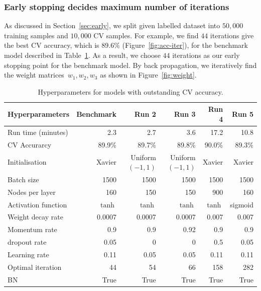 \subsubsection{Early stopping decides maximum number of iterations}
As discussed in Section~\ref{sec:early}, we split given labelled dataset into $50,000$ training samples and $10,000$ CV samples. For example, we find $44$ iterations give the best CV accuracy, which is $89.6\%$ (Figure~\ref{fig:acc-iter}), for the benchmark model described in Table~\ref{table:best-four-steps}. As a result, we choose $44$ iterations as our early stopping point for the benchmark model. By back propagation, we iteratively find the weight matrices~$w_1,w_2,w_3$ as shown in Figure~\ref{fig:weight}.
\begin{table}
\caption{Hyperparameters for models with outstanding CV accuracy.\label{table:best-four-steps}}
\centering
{\footnotesize
\begin{tabular}{@{}lrrrrr@{}}
\toprule
Hyperparameters                & Benchmark  & Run 2           & Run 3           & Run 4  & Run 5  \\ \midrule
Run time (minutes)             & 2.3     & 2.7              & 3.6              & 17.2    & 10.8    \\
CV Accurarcy                 & 89.9\%  & 89.7\%           & 89.8\%           & 90.0\%  & 89.3\%  \\
Initialisation            & Xavier  & \parbox[t]{1.3cm}{\raggedleft Uniform\\$(-1,1)$} 
& \parbox[t]{1.3cm}{\raggedleft Uniform\\$(-1,1)$} 
                                                                            & Xavier  & Xavier  \\
Batch size                & 1500    & 1500             & 1500             & 1500    & 1500    \\
Nodes per layer         & 160     & 150              & 150              & 900     & 160     \\
Activation function       & $\tanh$ & $\tanh$          & $\tanh$          & $\tanh$ & sigmoid \\
Weight decay rate         & 0.0007  & 0.0007           & 0.0007           & 0.007   & 0.007   \\
Momentum rate             & 0.9     & 0.9              & 0.92             & 0.9     & 0.9     \\
dropout rate              & 0.05    &0              & 0              & 0.5     & 0.05    \\
Learning rate             & 0.11    & 0.05             & 0.05             & 0.11    & 0.11    \\
Optimal iteration & 44      & 54               & 66               & 158     & 282     \\ 
BN & True      & True          & True          & True       & True          \\\bottomrule
\end{tabular}
}
\end{table}

